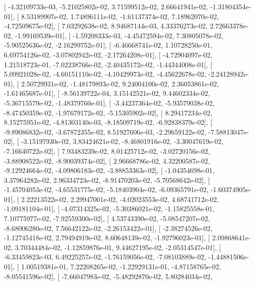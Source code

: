 \documentclass{article}
\begin{document}
       [ -4.32109733e-03,  -5.21025802e-02,   3.71599512e-02,
          2.66641941e-02,  -1.31804354e-01],
       [  8.53189907e-02,   1.74896111e-02,  -1.61137374e-02,
          7.18962070e-02,  -4.72509675e-02],
       [  7.03292638e-02,   8.94687144e-03,   4.33376273e-02,
          2.72663378e-02,  -1.99169539e-01],
       [ -1.59208333e-03,  -4.45472594e-02,   7.30805078e-02,
         -5.90525636e-02,  -2.16299752e-01],
       [ -6.46668741e-02,   1.10728250e-01,   6.69754126e-02,
         -3.07802942e-02,  -2.17264208e-01],
       [ -4.72904097e-02,   1.21518723e-01,  -7.02238766e-02,
         -2.40435172e-02,  -1.44344008e-01],
       [  5.09921028e-02,  -4.60151110e-02,  -4.10429973e-02,
         -4.45622678e-02,  -2.24128942e-01],
       [  2.50729931e-02,  -1.48179893e-02,   9.24004100e-02,
          2.36053861e-02,  -1.61465687e-01],
       [ -8.56139722e-04,   3.15142521e-02,   9.44602334e-02,
         -5.36715579e-02,  -1.48379760e-01],
       [ -3.44237364e-02,  -5.93579038e-02,  -8.47450359e-02,
         -1.97679172e-02,  -5.15305902e-02],
       [  8.29417234e-02,   8.15275951e-02,  -4.81303140e-03,
         -8.18509719e-02,  -6.92838379e-02],
       [ -9.89086832e-02,  -3.67872355e-02,   8.51927606e-03,
         -2.29659122e-02,  -7.58813047e-02],
       [ -3.15197930e-02,   3.83424621e-02,  -8.46801916e-02,
         -3.30047619e-02,  -7.16640722e-02],
       [  7.93483239e-02,   8.01425712e-02,  -3.02720156e-02,
         -3.88908522e-02,  -8.90039374e-02],
       [  2.96668786e-02,   4.32200587e-02,  -9.12924664e-02,
         -4.09806183e-02,  -3.88853363e-02],
       [ -1.04354698e-01,   3.37964282e-02,   2.96334723e-02,
         -8.91470203e-02,  -5.70568642e-02],
       [ -1.45704053e-02,  -4.65531775e-02,  -5.18403904e-02,
         -6.09365791e-02,  -1.60374905e-01],
       [  2.22213522e-02,   2.29947001e-02,  -4.02023553e-02,
          4.68741712e-02,  -1.09181104e-01],
       [ -4.07314325e-02,  -5.30386021e-02,  -1.15825558e-01,
          7.10775977e-02,  -7.92559300e-02],
       [  4.53743390e-02,  -5.08547207e-02,  -8.68006280e-02,
          7.56642122e-02,  -2.26153422e-01],
       [ -2.38274526e-02,  -1.12745418e-02,   2.79494919e-02,
          8.60648139e-02,  -1.92796023e-01],
       [  2.09868641e-02,   3.70344484e-02,  -1.12859876e-01,
          9.44627195e-02,  -2.05314547e-01],
       [ -6.33459823e-03,   6.49225257e-02,  -1.76159056e-02,
         -7.08103889e-02,  -1.44881506e-01],
       [  1.00519381e-01,   7.22208265e-02,  -1.22929131e-01,
         -4.87158765e-02,  -8.05541596e-02],
       [ -7.66047983e-02,  -5.48292870e-02,   5.80284034e-02,
\end{document}
